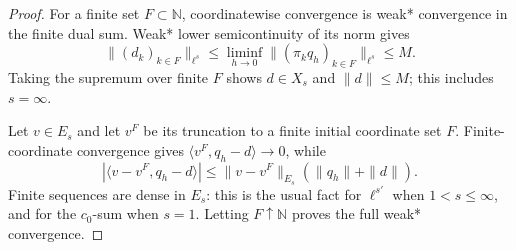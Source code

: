 \documentclass[11pt]{article}
\theoremstyle{remark}
\newcommand{\N}{\mathbb{N}}
\begin{document}
\begin{proof}
For a finite set $F\subset\N$, coordinatewise convergence is weak* convergence
in the finite dual sum.  Weak* lower semicontinuity of its norm gives
\[
 \|(d_k)_{k\in F}\|_{\ell^s}
 \le \liminf_{h\to0}\|(\pi_kq_h)_{k\in F}\|_{\ell^s}\le M.
\]
Taking the supremum over finite $F$ shows $d\in X_s$ and $\|d\|\le M$;
this includes $s=\infty$.

Let $v\in E_s$ and let $v^F$ be its truncation to a finite initial coordinate
set $F$.  Finite-coordinate convergence gives
$\langle v^F,q_h-d\rangle\to0$, while
\[
 |\langle v-v^F,q_h-d\rangle|
 \le \|v-v^F\|_{E_s}(\|q_h\|+\|d\|).
\]
Finite sequences are dense in $E_s$: this is the usual fact for
$\ell^{s'}$ when $1<s\le\infty$, and for the $c_0$-sum when $s=1$.
Letting $F\uparrow\N$ proves the full weak* convergence.
\end{proof}
\end{document}
